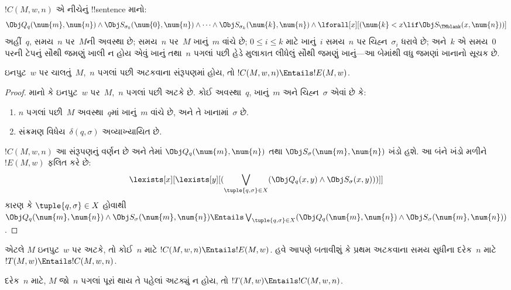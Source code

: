 \documentclass[../../../include/open-logic-section]{subfiles}
\begin{document}
\begin{defn}
$!C(M, w, n)$ એ નીચેનું !!{sentence} માનો:
\[
\Obj Q_q(\num{m}, \num{n}) \land \Obj S_{\sigma_0}(\num{0}, \num{n})
\land \dots \land \Obj S_{\sigma_k}(\num{k}, \num{n}) \land
\lforall[x][(\num{k} < x \lif \Obj S_\TMblank(x, \num{n}))]
\]
અહીં~$q$, સમય~$n$ પર~$M$ની અવસ્થા છે;
સમય~$n$ પર~$M$ ખાનું~$m$ વાંચે છે;
$0 \le i \le k$ માટે ખાનું~$i$ સમય~$n$ પર
ચિહ્ન~$\sigma_i$ ધરાવે છે;
અને~$k$ એ સમય~$0$ પરની ટેપનું સૌથી જમણું ખાલી
ન હોય એવું ખાનું તથા~$n$ પગલાં પછી હેડે મુલાકાત
લીધેલું સૌથી જમણું ખાનું—આ બેમાંથી વધુ જમણાં
ખાનાનો સૂચક છે.
\end{defn}

\begin{lem}
ઇનપુટ~$w$ પર ચાલતું~$M$,~$n$ પગલાં પછી
અટકવાના સંરૂપણમાં હોય, તો
$!C(M, w, n) \Entails !E(M, w)$.
\end{lem}

\begin{proof}
માનો કે ઇનપુટ~$w$ પર~$M$,~$n$ પગલાં પછી અટકે છે.
કોઈ અવસ્થા~$q$, ખાનું~$m$ અને ચિહ્ન~$\sigma$
એવાં છે કે:
\begin{enumerate}
\item $n$ પગલાં પછી~$M$ અવસ્થા~$q$માં ખાનું~$m$
  વાંચે છે, અને તે ખાનામાં~$\sigma$ છે.
\item સંક્રમણ વિધેય~$\delta(q, \sigma)$ અવ્યાખ્યાયિત છે.
\end{enumerate}
$!C(M, w, n)$ આ સંરૂપણનું વર્ણન છે અને તેમાં
$\Obj Q_{q}(\num{m}, \num{n})$ તથા
$\Obj S_{\sigma}(\num{m}, \num{n})$ ખંડો હશે.
આ બંને ખંડો મળીને~$!E(M, w)$ ફલિત કરે છે:
\[
\lexists[x][\lexists[y][(\bigvee_{\tuple{q, \sigma} \in
      X}(\Obj Q_q(x, y) \land \Obj S_\sigma(x, y)))]]
\]
કારણ કે $\tuple{q,\sigma} \in X$ હોવાથી
$\Obj Q_q(\num{m}, \num{n}) \land
\Obj S_{\sigma}(\num{m}, \num{n}) \Entails
\bigvee_{\tuple{q, \sigma} \in X}
(\Obj Q_q(\num{m}, \num{n}) \land
\Obj S_{\sigma}(\num{m}, \num{n}))$.
\end{proof}

\begin{explain}
એટલે $M$ ઇનપુટ~$w$ પર અટકે, તો કોઈ~$n$ માટે
$!C(M, w, n) \Entails !E(M,w)$. હવે આપણે
બતાવીશું કે પ્રથમ અટકવાના સમય સુધીના દરેક~$n$ માટે
$!T(M, w) \Entails !C(M, w, n)$.
\end{explain}

\begin{lem}
દરેક~$n$ માટે, $M$ જો~$n$ પગલાં પૂરાં થાય તે
પહેલાં અટક્યું ન હોય, તો
$!T(M, w) \Entails !C(M, w, n)$.
\end{lem}
\end{document}
